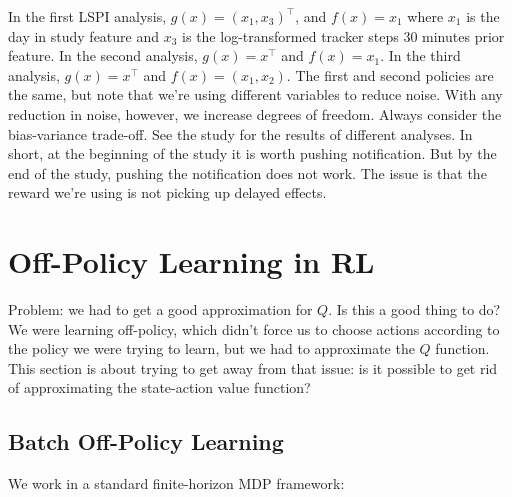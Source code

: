 \documentclass[11pt]{article}
\begin{document}
In the first LSPI analysis, $g(x) = (x_1, x_3)^\top$, and $f(x) = x_1$ where $x_1$ is the day in study feature and $x_3$ is the log-transformed tracker steps 30 minutes prior feature. In the second analysis, $g(x) = x^\top$ and $f(x) = x_1$. In the third analysis, $g(x) = x^\top$ and $f(x) = (x_1,x_2)$. The first and second policies are the same, but note that we're using different variables to reduce noise. With any reduction in noise, however, we increase degrees of freedom. Always consider the bias-variance trade-off. See the study for the results of different analyses. In short, at the beginning of the study it is worth pushing notification. But by the end of the study, pushing the notification does not work. The issue is that the reward we're using is not picking up delayed effects.

\section{Off-Policy Learning in RL}

Problem: we had to get a good approximation for $Q$. Is this a good thing to do? We were learning off-policy, which didn't force us to choose actions according to the policy we were trying to learn, but we had to approximate the $Q$ function. This section is about trying to get away from that issue: is it possible to get rid of approximating the state-action value function?

\subsection{Batch Off-Policy Learning}

We work in a standard finite-horizon MDP framework:
\end{document}
